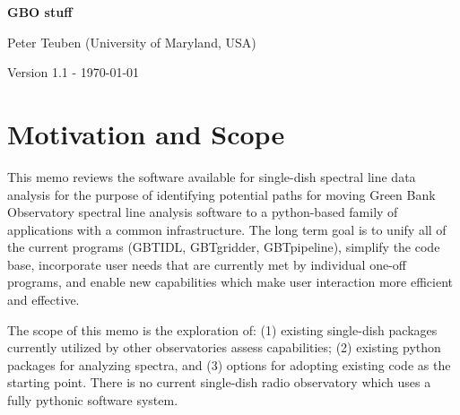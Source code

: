 \documentclass[12pt,a4paper]{article}
\begin{document}
\pagestyle{plain}
 

\begin{center}
{\Large{\bf{  GBO stuff  \\  }}} 

\end{center}
\bigskip

\centerline{Peter Teuben (University of Maryland, USA)}

\centerline{Version 1.1 - \today}
\bigskip

\begin{abstract}

This is the working document discussing the status of SD data analysis
systems.  Supporting code and documentation can be found in
\url{https://github.com/teuben/gbtoy}.  Another shorter version of this
can be found on overleaf, which is the GBO white paper released Dec 2019
(title TBD).

Additional notes were added during the {\tt dysh} development, merely
as a placeholder before going in non-latex documents.

\end{abstract}

\tableofcontents

\section{Motivation and Scope}

This memo reviews the software available for single-dish spectral line data analysis for the purpose of identifying potential paths for moving Green Bank Observatory spectral line analysis software to a python-based family of applications with a common infrastructure. The long term goal is to unify all of the current programs (GBTIDL, GBTgridder, GBTpipeline), simplify the code base, incorporate user needs that are currently met by individual one-off programs, and enable new capabilities which make user interaction more efficient and effective.

The scope of this memo is the exploration of: (1) existing single-dish packages currently utilized by other observatories assess capabilities; (2) existing python packages for analyzing spectra, and (3) options for adopting existing code as the starting point. There is no current single-dish radio observatory which uses a fully pythonic software system.
\end{document}
